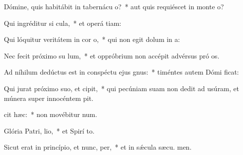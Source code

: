 \item Dómine, quis habitábit in tabernácu o?~* aut quis requiéscet in monte  o?
\item Qui ingréditur si cula,~* et operá tiam:
\item Qui lóquitur veritátem in cor o,~* qui non egit dolum in  a:
\item Nec fecit próximo su lum,~* et oppróbrium non accépit advérsus pró os.
\item Ad níhilum dedúctus est in conspéctu ejus gnus:~* timéntes autem Dómi ficat:
\item Qui jurat próximo suo, et  cipit,~* qui pecúniam suam non dedit ad usúram, et múnera super innocéntem  pit.
\item {} cit hæc:~* non movébitur  num.
\item Glória Patri,  lio,~* et Spirí to.
\item Sicut erat in princípio, et nunc,  per,~* et in sǽcula sæcu. men.
